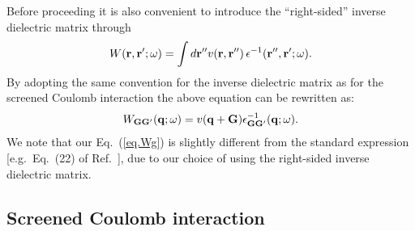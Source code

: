 \documentclass[twocolumn,prb,showpacs,superscriptaddress]{revtex4}
\def\w{\omega}
\def\q{{\bf q}}
\def\G{{\bf G}}
\def\Gp{{\bf G^\prime}}
\def\r{{\bf r}}
\def\rp{{\bf r^\prime}}
\def\rpp{{\bf r^{\prime\prime}}}
\begin{document}
Before proceeding it is also convenient to introduce the ``right-sided'' inverse dielectric matrix
through
  \begin{equation}
  W(\r,\rp;\w) = \int d\rpp v(\r,\rpp) \, \epsilon^{-1}(\rpp,\rp;\w).
  \end{equation}
By adopting the same convention for the inverse dielectric matrix
as for the screened Coulomb interaction 
the above equation can be rewritten as:
  \begin{equation}\label{eq.Wg}
  W_{\G\Gp}(\q;\w) = v(\q+\G)  \epsilon^{-1}_{\G\Gp}(\q;\w).
  \end{equation}
We note that our Eq.\ (\ref{eq.Wg}) is slightly different from the
standard expression [e.g.\ Eq.\ (22) of Ref.\ ], due
to our choice of using the right-sided inverse dielectric matrix.

\subsection{Screened Coulomb interaction}\label{sec.coulomb.g}
\end{document}
